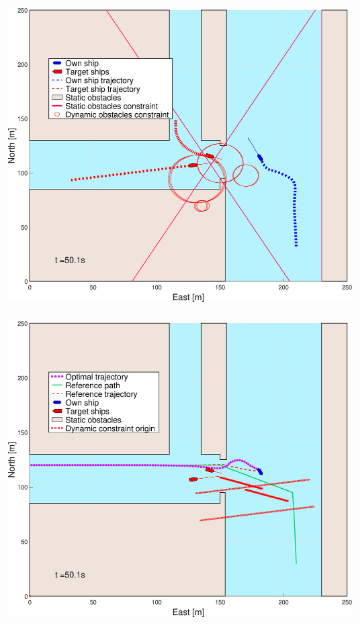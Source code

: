 \begin{figure}[!ht]
\begin{subfigure}[b]{0.494\textwidth}
        \subcaption{}
    \end{subfigure}
    \hfill
    \\
    \begin{subfigure}[b]{0.494\textwidth}
        \centering
        \includegraphics[width=\textwidth]{Images/Figures/Havn1/_Simple_1fig1_time=50}
        \subcaption{}
    \end{subfigure}
    \hfill
    \begin{subfigure}[b]{0.494\textwidth}
        \centering
        \includegraphics[width=\textwidth]{Images/Figures/Havn1/_Simple_1fig999_time=50}
        \subcaption{}
    \end{subfigure}
    \hfill
    \label{FIG: Canals Without Pred}
\end{figure}%
